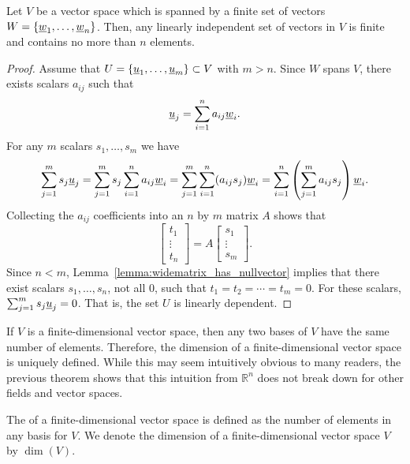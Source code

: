 \begin{theorem}
Let $V$ be a vector space which is spanned by a finite set of vectors $W = \left\{ \underline{w}_1, \ldots, \underline{w}_n \right\}$.
Then, any linearly independent set of vectors in $V$ is finite and contains no more than $n$ elements.
\end{theorem}
\begin{proof}
Assume that $U = \left\{ \underline{u}_1, \ldots, \underline{u}_m \right\} \subset V$ with $m > n$.
Since $W$ spans $V$, there exists scalars $a_{ij}$ such that
\begin{equation*}
\underline{u}_j = \sum_{i=1}^n a_{ij} \underline{w}_i.
\end{equation*}
For any $m$ scalars $s_1, \ldots, s_m$ we have
\begin{equation*}
\sum_{j=1}^m s_j \underline{u}_j
= \sum_{j=1}^m s_j \sum_{i=1}^n a_{ij} \underline{w}_i
= \sum_{j=1}^m \sum_{i=1}^n ( a_{ij} s_j ) \underline{w}_i
= \sum_{i=1}^n \left( \sum_{j=1}^m a_{ij} s_j \right) \underline{w}_i . 
\end{equation*}
Collecting the $a_{ij}$ coefficients into an $n$ by $m$ matrix $A$ shows that
\begin{equation*}
\left[ \begin{array}{c} t_1 \\ \vdots \\ t_n \end{array} \right] = A \left[ \begin{array}{c} s_1 \\ \vdots \\ s_m \end{array} \right].
\end{equation*}
Since $n<m$, Lemma~\ref{lemma:widematrix_has_nullvector} implies that there exist scalars $s_1, \ldots, s_n$, not all $0$, such that $t_1 = t_2 = \cdots = t_m = 0$.
For these scalars, $\sum_{j=1}^m s_j \underline{u}_j = 0$.
That is, the set $U$ is linearly dependent.
\end{proof}

If $V$ is a finite-dimensional vector space, then any two bases of $V$ have the same number of elements.
Therefore, the dimension of a finite-dimensional vector space is uniquely defined.
While this may seem intuitively obvious to many readers, the previous theorem shows that this intuition from $\mathbb{R}^n$ does not break down for other fields and vector spaces.

\begin{definition}
The  of a finite-dimensional vector space is defined as the number of elements in any basis for $V$.
We denote the dimension of a finite-dimensional vector space $V$ by $\dim(V)$.
\end{definition}

